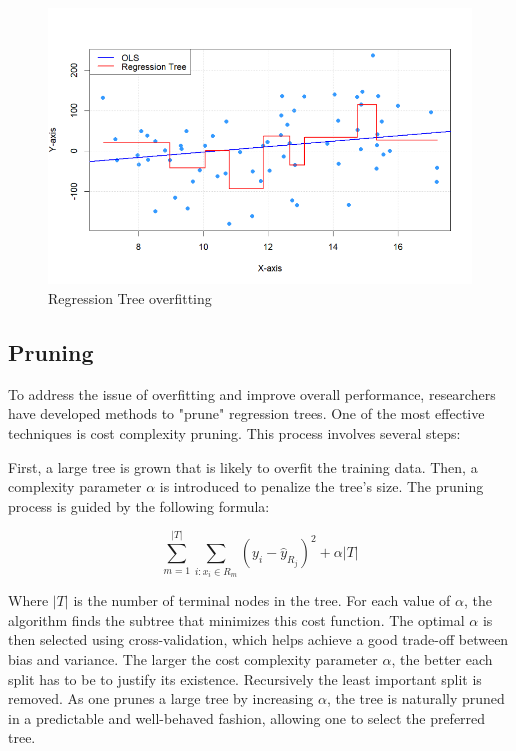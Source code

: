 \documentclass[12pt]{article}
\begin{document}
\begin{figure}
    \centering
    \includegraphics[scale=0.50]{image.png}
    \caption{Regression Tree overfitting}
    \label{overfitting_tree}
\end{figure}




\subsection{Pruning}

To address the issue of overfitting and improve overall performance, researchers have developed methods to "prune" regression trees. One of the most effective techniques is cost complexity pruning. This process involves several steps:

First, a large tree is grown that is likely to overfit the training data. Then, a complexity parameter $\alpha$ is introduced to penalize the tree's size. The pruning process is guided by the following formula:

\begin{equation}
    \sum_{m=1}^{|T|} \sum_{i: x_i \in R_m} (y_i - \hat{y}_{R_j})^2 + \alpha|T|
\end{equation}

Where $|T|$ is the number of terminal nodes in the tree. For each value of $\alpha$, the algorithm finds the subtree that minimizes this cost function. The optimal $\alpha$ is then selected using cross-validation, which helps achieve a good trade-off between bias and variance. The larger the cost complexity parameter $\alpha$, the better each split has to be to justify its existence. Recursively the least important split is removed. As one prunes a large tree by increasing $\alpha$, the tree is naturally pruned in a predictable and well-behaved fashion, allowing one to select the preferred tree.
\end{document}
